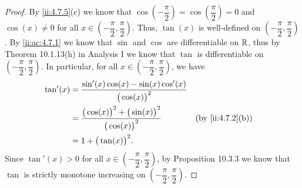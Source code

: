 \begin{proof}
  By \cref{ii:4.7.5}(c) we know that \(\cos(-\dfrac{\pi}{2}) = \cos(\dfrac{\pi}{2}) = 0\) and \(\cos(x) \neq 0\) for all \(x \in (-\dfrac{\pi}{2}, \dfrac{\pi}{2})\).
  Thus, \(\tan(x)\) is well-defined on \((-\dfrac{\pi}{2}, \dfrac{\pi}{2})\).
  By \cref{ii:ac:4.7.1} we know that \(\sin\) and \(\cos\) are differentiable on \(\mathbb{R}\), thus by Theorem 10.1.13(h) in Analysis I we know that \(\tan\) is differentiable on \((-\dfrac{\pi}{2}, \dfrac{\pi}{2})\).
  In particular, for all \(x \in (-\dfrac{\pi}{2}, \dfrac{\pi}{2})\), we have
  \begin{align*}
    \tan'(x) & = \dfrac{\sin'(x) \cos(x) - \sin(x) \cos'(x)}{\big(\cos(x)\big)^2}                             \\
             & = \dfrac{\big(\cos(x)\big)^2 + \big(\sin(x)\big)^2}{\big(\cos(x)\big)^2} &  & \by{ii:4.7.2}[b] \\
             & = 1 + \big(\tan(x)\big)^2.
  \end{align*}
  Since \(\tan'(x) > 0\) for all \(x \in (-\dfrac{\pi}{2}, \dfrac{\pi}{2})\), by Proposition 10.3.3 we know that \(\tan\) is strictly monotone increasing on \((-\dfrac{\pi}{2}, \dfrac{\pi}{2})\).


\end{proof}
